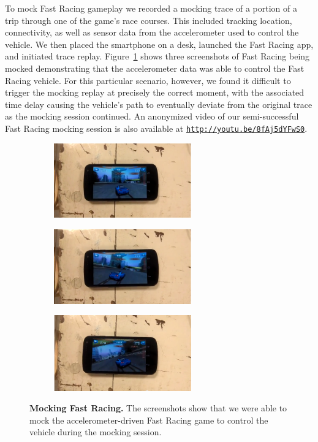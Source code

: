To mock Fast Racing gameplay we recorded a mocking trace of a portion of a
trip through one of the game's race courses.  This included tracking location,
connectivity, as well as sensor data from the accelerometer used to control
the vehicle. We then placed the smartphone on a desk, launched the Fast
Racing app, and initiated trace replay. Figure~\ref{fig-mocking-game} shows
three screenshots of Fast Racing being mocked demonstrating that the
accelerometer data was able to control the Fast Racing vehicle. For this
particular scenario, however, we found it difficult to trigger the mocking
replay at precisely the correct moment, with the associated time delay
causing the vehicle's path to eventually deviate from the original trace as
the mocking session continued. An anonymized video of our semi-successful
Fast Racing mocking session is also available at
\hyperlink{http://youtu.be/8fAj5dYFwS0}{\texttt{http://youtu.be/8fAj5dYFwS0}}.

\begin{figure}[t]

\begin{subfigure}[t]{2.33in}
\includegraphics[width=2.33in]{./figures/apps/fast_racing/fastracing1.png}
\caption{}
\end{subfigure}%
\begin{subfigure}[t]{2.33in}
\includegraphics[width=2.33in]{./figures/apps/fast_racing/fastracing2.png}
\caption{}
\end{subfigure}%
\begin{subfigure}[t]{2.33in}
\includegraphics[width=2.33in]{./figures/apps/fast_racing/fastracing3.png}
\caption{}
\end{subfigure}

\caption{\textbf{Mocking Fast Racing.} The screenshots show that we were able
  to mock the accelerometer-driven Fast Racing game to control the vehicle
during the mocking session.}

\label{fig-mocking-game}

\end{figure}

